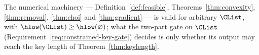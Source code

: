 
The numerical machinery --- Definition~\ref{def:feasible},
Theorems~\ref{thm:convexity}, \ref{thm:removal}, \ref{thm:choi} and
\ref{thm:gradient} --- is valid for arbitrary $\CList$, with
$\hlow(\CList)\ge\hlow(\varnothing)$; what the two-part gate on $\CList$
(Requirement~\ref{req:constrained-key-gate}) decides is only whether its
output may reach the key length of Theorem~\ref{thm:keylength}.

